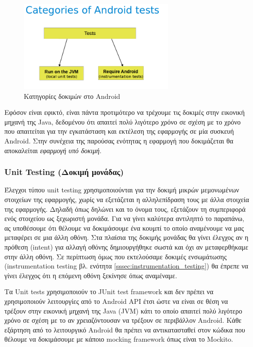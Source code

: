 	\begin{figure}[h]
	    \centering
	    \includegraphics[width=0.7\textwidth]{categories_of_android_tests.png}
	    \caption{ Κατηγορίες δοκιμών στο Android}
	    \label{fig:categories_of_android_tests}
	\end{figure}
	
	Εφόσον είναι εφικτό, είναι πάντα προτιμότερο να τρέχουμε τις δοκιμές στην εικονική μηχανή της Java, δεδομένου ότι απαιτεί πολύ λιγότερο χρόνο σε σχέση με το χρόνο που απαιτείται για την εγκατάσταση και εκτέλεση της εφαρμογής σε μία συσκευή Android. Στην συνέχεια της παρούσας ενότητας η εφαρμογή που δοκιμάζεται θα αποκαλείται \textit{εφαρμογή υπό δοκιμή}.
		\subsubsection{Unit Testing (Δοκιμή μονάδας)}
		Έλεγχοι τύπου unit testing χρησιμοποιούνται για την δοκιμή μικρών μεμονωμένων στοιχείων της εφαρμογής, χωρίς να εξετάζεται η αλληλεπίδραση τους με άλλα στοιχεία της εφαρμογής. Δηλαδή όπως δηλώνει και το όνομα τους, εξετάζουν τη συμπεριφορά ενός στοιχείου ως ξεχωριστή μονάδα. Για να γίνει καλύτερα αντιληπτό το παραπάνω, ας υποθέσουμε ότι θέλουμε να δοκιμάσουμε ένα κουμπί το οποίο αναμένουμε να μας μεταφέρει σε μια άλλη οθόνη.  Στα πλαίσια της δοκιμής μονάδας θα γίνει έλεγχος αν η πρόθεση (intent) για αλλαγή οθόνης δημιουργήθηκε σωστά και όχι αν μεταφερθήκαμε στην άλλη οθόνη. Σε περίπτωση όμως που εκτελούσαμε δοκιμές ενσωμάτωσης (instrumentation testing βλ. ενότητα \ref{sssec:instrumentation_testing}) θα έπρεπε να γίνει έλεγχος ότι η επόμενη οθόνη ξεκίνησε όπως αναμέναμε.
		
		Τα Unit tests χρησιμοποιούν το JUnit test framework και δεν πρέπει να χρησιμοποιούν λειτουργίες από το Android API έτσι ώστε να είναι σε θέση να τρέξουν στην εικονική μηχανή της Java (JVM) κάτι το οποίο απαιτεί πολύ λιγότερο χρόνο σε σχέση με το αν χρειαζόντουσαν να τρέξουν σε περιβάλλον Android. Κάθε εξάρτηση από το λειτουργικό Android θα πρέπει να αντικατασταθεί στον κώδικα που θέλουμε να δοκιμάσουμε με κάποιο mocking framework όπως είναι το Mockito. 
		
